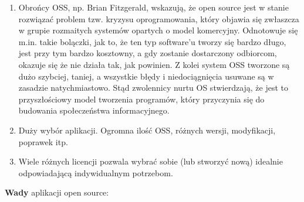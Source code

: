 \documentclass{article}
\begin{document}
\begin{enumerate}
    \item Obrońcy OSS, np. Brian Fitzgerald, wskazują, że open source jest w stanie rozwiązać problem tzw. kryzysu oprogramowania, który objawia się zwłaszcza w grupie rozmaitych systemów opartych o model komercyjny. Odnotowuje się m.in. takie bolączki, jak to, że ten typ software'u tworzy się bardzo długo, jest przy tym bardzo kosztowny, a gdy zostanie dostarczony odbiorcom, okazuje się że nie działa tak, jak powinien. Z kolei system OSS tworzone są dużo szybciej, taniej, a wszystkie błędy i niedociągnięcia usuwane są w zasadzie natychmiastowo. Stąd zwolennicy nurtu OS stwierdzają, że jest to przyszłościowy model tworzenia programów, który przyczynia się do budowania społeczeństwa informacyjnego\cite{Kotula}.
    
    \item Duży wybór aplikacji. Ogromna ilość OSS, różnych wersji, modyfikacji, poprawek itp\cite{Kotula}.
    
    \item Wiele różnych licencji pozwala wybrać sobie (lub stworzyć nową) idealnie odpowiadającą indywidualnym potrzebom\cite{Kotula}. 
\end{enumerate}

\textbf{Wady} aplikacji open source:
\end{document}
